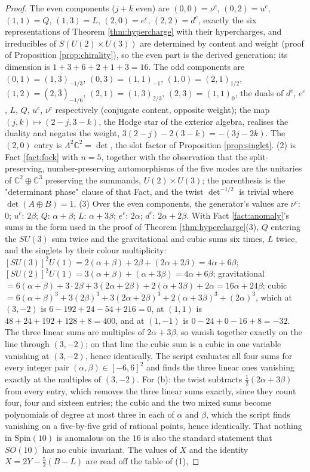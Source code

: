 \documentclass[11pt]{article}
\theoremstyle{definition}
\newcommand{\C}{\mathbb{C}}
\begin{document}
\begin{proof}
The even components ($j + k$ even) are $(0,0) = \nu^{c}$, $(0,2) = u^{c}$, $(1,1) = Q$, $(1,3) = L$, $(2,0) = e^{c}$, $(2,2) = d^{c}$, exactly the six representations of Theorem \ref{thm:hypercharge} with their hypercharges, and irreducibles of $S(U(2) \times U(3))$ are determined by content and weight (proof of Proposition \ref{prop:chirality}), so the even part is the derived generation; its dimension is $1 + 3 + 6 + 2 + 1 + 3 = 16$. The odd components are $(0,1) = (1,3)_{-1/3}$, $(0,3) = (1,1)_{-1}$, $(1,0) = (2,1)_{1/2}$, $(1,2) = (2,\bar{3})_{-1/6}$, $(2,1) = (1,3)_{2/3}$, $(2,3) = (1,1)_{0}$, the duals of $d^{c}$, $e^{c}$, $L$, $Q$, $u^{c}$, $\nu^{c}$ respectively (conjugate content, opposite weight); the map $(j, k) \mapsto (2 - j, 3 - k)$, the Hodge star of the exterior algebra, realises the duality and negates the weight, $3(2-j) - 2(3-k) = -(3j - 2k)$. The $(2,0)$ entry is $\Lambda^{2}\C^{2} = \det$, the slot factor of Proposition \ref{prop:singlet}. (2) is Fact \ref{fact:fock} with $n = 5$, together with the observation that the split-preserving, number-preserving automorphisms of the five modes are the unitaries of $\C^{2} \oplus \C^{3}$ preserving the summands, $U(2) \times U(3)$; the parenthesis is the "determinant phase" clause of that Fact, and the twist $\det^{-1/2}$ is trivial where $\det(A \oplus B) = 1$. (3) Over the even components, the generator's values are $\nu^{c}$: $0$; $u^{c}$: $2\beta$; $Q$: $\alpha + \beta$; $L$: $\alpha + 3\beta$; $e^{c}$: $2\alpha$; $d^{c}$: $2\alpha + 2\beta$. With Fact \ref{fact:anomaly}'s sums in the form used in the proof of Theorem \ref{thm:hypercharge}(3), $Q$ entering the $SU(3)$ sum twice and the gravitational and cubic sums six times, $L$ twice, and the singlets by their colour multiplicity: $[SU(3)]^{2}U(1) = 2(\alpha + \beta) + 2\beta + (2\alpha + 2\beta) = 4\alpha + 6\beta$; $[SU(2)]^{2}U(1) = 3(\alpha + \beta) + (\alpha + 3\beta) = 4\alpha + 6\beta$; gravitational $= 6(\alpha + \beta) + 3 \cdot 2\beta + 3(2\alpha + 2\beta) + 2(\alpha + 3\beta) + 2\alpha = 16\alpha + 24\beta$; cubic $= 6(\alpha + \beta)^{3} + 3(2\beta)^{3} + 3(2\alpha + 2\beta)^{3} + 2(\alpha + 3\beta)^{3} + (2\alpha)^{3}$, which at $(3, -2)$ is $6 - 192 + 24 - 54 + 216 = 0$, at $(1, 1)$ is $48 + 24 + 192 + 128 + 8 = 400$, and at $(1, -1)$ is $0 - 24 + 0 - 16 + 8 = -32$. The three linear sums are multiples of $2\alpha + 3\beta$, so vanish together exactly on the line through $(3,-2)$; on that line the cubic sum is a cubic in one variable vanishing at $(3,-2)$, hence identically. The script evaluates all four sums for every integer pair $(\alpha, \beta) \in [-6, 6]^{2}$ and finds the three linear ones vanishing exactly at the multiples of $(3, -2)$. For (b): the twist subtracts $\tfrac12(2\alpha + 3\beta)$ from every entry, which removes the three linear sums exactly, since they count four, four and sixteen entries; the cubic and the two mixed sums become polynomials of degree at most three in each of $\alpha$ and $\beta$, which the script finds vanishing on a five-by-five grid of rational points, hence identically. That nothing in $\mathrm{Spin}(10)$ is anomalous on the $16$ is also the standard statement that $SO(10)$ has no cubic invariant. The values of $X$ and the identity $X = 2Y - \tfrac52(B - L)$ are read off the table of (1), 
\end{proof}
\end{document}
